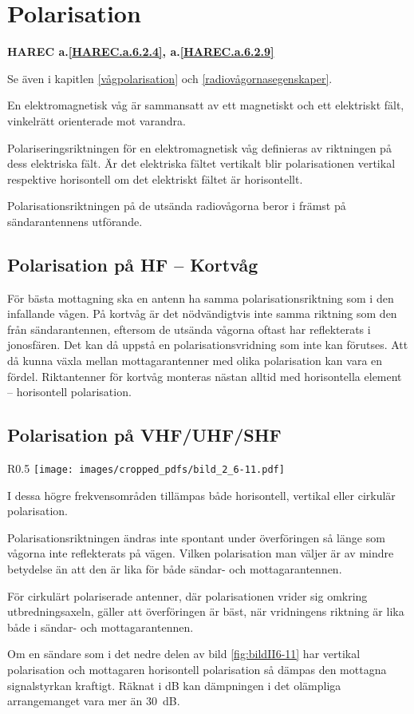 \section{Polarisation}
\textbf{
HAREC a.\ref{HAREC.a.6.2.4}\label{myHAREC.a.6.2.4}, a.\ref{HAREC.a.6.2.9}\label{myHAREC.a.6.2.9}
}

Se även i kapitlen \ref{vågpolarisation} och \ref{radiovågornasegenskaper}.

En elektromagnetisk våg är sammansatt av ett magnetiskt och ett
elektriskt fält, vinkelrätt orienterade mot varandra.

Polariseringsriktningen för en elektromagnetisk våg definieras av riktningen på
dess elektriska fält.
Är det elektriska fältet vertikalt blir polarisationen vertikal respektive
horisontell om det elektriskt fältet är horisontellt.

Polarisationsriktningen på de utsända radiovågorna beror i främst på
sändarantennens utförande.

\subsection{Polarisation på HF -- Kortvåg}
För bästa mottagning ska en antenn ha samma polarisationsriktning som i den
infallande vågen.
På kortvåg är det nödvändigtvis inte samma riktning som den från
sändarantennen, eftersom de utsända vågorna oftast har reflekterats i
jonosfären.
Det kan då uppstå en polarisationsvridning som inte kan förutses.
Att då kunna växla mellan mottagarantenner med olika polarisation kan vara en
fördel.
Riktantenner för kortvåg monteras nästan alltid med horisontella element --
horisontell polarisation.

\subsection{Polarisation på VHF/UHF/SHF}

\begin{wrapfigure}{R}{0.5\textwidth}
  \texttt{[image: images/cropped\_pdfs/bild\_2\_6-11.pdf]}
  \caption{Inverkan av polarisation}
  \label{fig:bildII6-11}
\end{wrapfigure}

I dessa högre frekvensområden tillämpas både horisontell, vertikal eller
cirkulär polarisation.

Polarisationsriktningen ändras inte spontant under överföringen så
länge som vågorna inte reflekterats på vägen.
Vilken polarisation man väljer är av mindre betydelse än att den är lika
för både sändar- och mottagarantennen.

För cirkulärt polariserade antenner, där polarisationen vrider sig
omkring utbredningsaxeln, gäller att överföringen är bäst, när
vridningens riktning är lika både i sändar- och mottagarantennen.

Om en sändare som i det nedre delen av bild \ref{fig:bildII6-11} har vertikal
polarisation och mottagaren horisontell polarisation så dämpas den mottagna
signalstyrkan kraftigt.
Räknat i dB kan dämpningen i det olämpliga arrangemanget vara mer än 30~dB.
